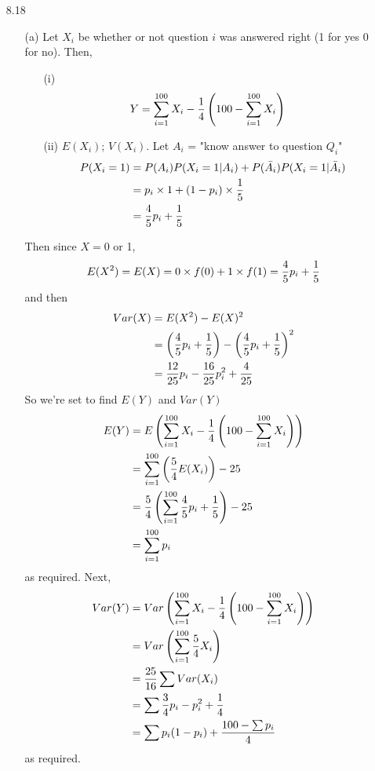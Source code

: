 \documentclass[english, 11pt]{article}
\begin{document}
\begin{itemize}
  \item[8.18]
  \begin{itemize}
    \item[(a)] Let $X_i$ be whether or not question $i$ was answered right (1 for yes 0 for no). Then,
    \begin{itemize}
      \item[(i)]
       \begin{align*}
        Y & = \sum_{i = 1}^{100} X_i - \frac{1}{4}\left(100 - \sum_{i = 1}^{100} X_i\right)
       \end{align*}
      \item[(ii)]
      $E(X_i)$; $V(X_i)$. Let $A_i$ = "know answer to question $Q_i$"
     \begin{align*}
       P(X_i = 1) & = P(A_i)P(X_i = 1|A_i) + P(\bar{A_i})P(X_i = 1|\bar{A_i}) \\
       & = p_i \times 1 + (1-p_i) \times \frac{1}{5} \\
       & = \frac{4}{5}p_i + \frac{1}{5}
     \end{align*}
    \end{itemize}
    Then since $X = 0$ or 1,
    \[ E(X^2) = E(X) = 0\times f(0) + 1\times f(1) = \frac{4}{5}p_i + \frac{1}{5} \]
    and then
    \begin{align*}
      Var(X) & = E(X^2) - E(X)^2 \\
             & = \left( \frac{4}{5}p_i + \frac{1}{5} \right) - \left( \frac{4}{5}p_i + \frac{1}{5} \right)^2 \\
             & = \frac{12}{25}p_i - \frac{16}{25}p_i^2 + \frac{4}{25}
    \end{align*}
    So we're set to find $E(Y)$ and $Var(Y)$
    \begin{align*}
      E(Y) & = E \left( \sum_{i = 1}^{100} X_i - \frac{1}{4}\left(100 - \sum_{i = 1}^{100} X_i\right) \right) \\
           & = \sum_{i = 1}^{100} \left( \frac{5}{4} E(X_i) \right) - 25 \\
           & = \frac{5}{4} \left(\sum_{i=1}^{100} \frac{4}{5}p_i + \frac{1}{5}\right) - 25 \\
           & = \sum_{i =1}^{100}p_i
    \end{align*}
    as required. Next,
    \begin{align*}
      Var(Y) & = Var\left( \sum_{i = 1}^{100} X_i - \frac{1}{4}\left(100 - \sum_{i = 1}^{100} X_i\right) \right) \\
      & = Var \left( \sum_{i=1}^{100} \frac{5}{4} X_i \right) \\
      & = \frac{25}{16} \sum  Var(X_i) \\
      & = \sum \frac{3}{4} p_i - p_i^2 + \frac{1}{4} \\
      & = \sum p_i(1-p_i) + \frac{100-\sum p_i}{4}
    \end{align*}
    as required.


\end{itemize}
\end{itemize}
\end{document}
